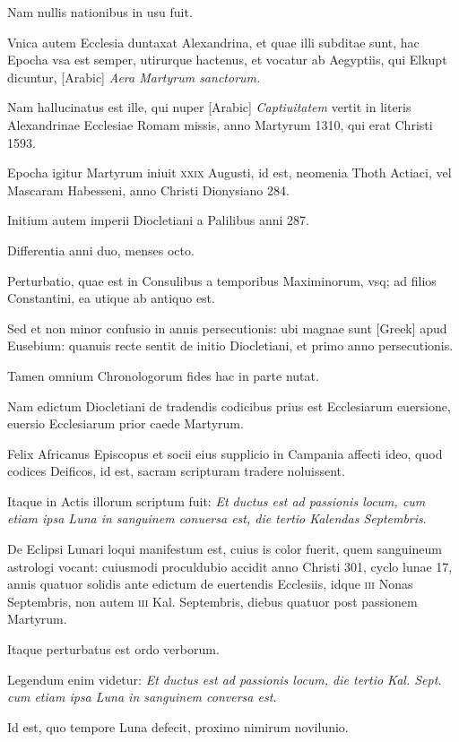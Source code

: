 \begin{parnumbers}
Nam
nullis nationibus in usu fuit.

Vnica autem Ecclesia duntaxat Alexandrina,
et quae illi subditae sunt, hac Epocha vsa est semper, utirurque
hactenus, et vocatur ab Aegyptiis, qui Elkupt dicuntur,
\textarabic{[Arabic]} \textit{Aera Martyrum sanctorum.}

Nam
hallucinatus est ille, qui nuper \textarabic{[Arabic]}
\textit{Captiuitatem} vertit in literis
Alexandrinae Ecclesiae Romam missis, anno Martyrum 1310, qui
erat Christi 1593.

Epocha igitur Martyrum iniuit \textsc{xxix} Augusti,
id est, neomenia Thoth Actiaci, vel Mascaram Habesseni, anno Christi
Dionysiano 284.

Initium autem imperii Diocletiani a Palilibus
anni 287.

Differentia anni duo, menses octo.

Perturbatio, quae est in
Consulibus a temporibus Maximinorum, vsq; ad filios Constantini,
ea utique ab antiquo est.

Sed et non minor confusio in annis persecutionis:
ubi magnae sunt \textgreek{[Greek]} apud Eusebium: quanuis
recte sentit de initio Diocletiani, et primo anno persecutionis.

Tamen
omnium Chronologorum fides hac in parte nutat.

Nam edictum
Diocletiani de tradendis codicibus prius est Ecclesiarum euersione,
euersio Ecclesiarum prior caede Martyrum.

Felix Africanus Episcopus
et socii eius supplicio in Campania affecti ideo, quod codices
Deificos, id est, sacram scripturam tradere noluissent.

Itaque in
Actis illorum scriptum fuit: \textit{Et ductus est ad passionis locum, cum etiam
ipsa Luna in sanguinem conuersa est, die tertio Kalendas Septembris}.

De Eclipsi
Lunari loqui manifestum est, cuius is color fuerit, quem sanguineum
astrologi vocant: cuiusmodi proculdubio accidit anno Christi
301, cyclo lunae 17, annis quatuor solidis ante edictum de euertendis
Ecclesiis, idque \textsc{iii} Nonas Septembris, non autem \textsc{iii} Kal.
Septembris, diebus quatuor post passionem Martyrum.

Itaque perturbatus
est ordo verborum.

Legendum enim videtur: \textit{Et ductus est ad passionis
locum, die tertio Kal. Sept. cum etiam ipsa Luna in sanguinem conversa
est.}

Id est, quo tempore Luna defecit, proximo nimirum novilunio.


\end{parnumbers}
